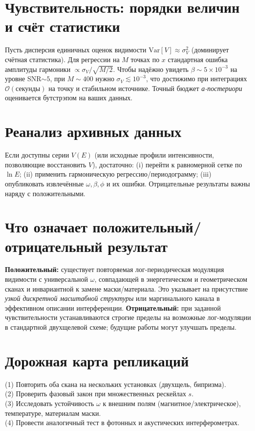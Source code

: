 \documentclass[a4paper,12pt]{article}
\begin{document}
\section{Чувствительность: порядки величин и счёт статистики}
Пусть дисперсия единичных оценок видимости $\mathrm{Var}[V]\approx\sigma_V^2$ (доминирует счётная статистика).
Для регрессии на $M$ точках по $x$ стандартная ошибка амплитуды гармоники $\propto\sigma_V/\sqrt{M/2}$.
Чтобы надёжно увидеть $\beta\sim5\times10^{-3}$ на уровне SNR$\sim5$, при $M\sim400$ нужно $\sigma_V\lesssim10^{-3}$,
что достижимо при интеграциях $\mathcal{O}(\text{секунды})$ на точку и стабильном источнике. Точный бюджет \emph{а-постериори}
оценивается бутстрэпом на ваших данных.

\section{Реанализ архивных данных}
Если доступны серии $V(E)$ (или исходные профили интенсивности, позволяющие восстановить $V$), достаточно:
(i) перейти к равномерной сетке по $\ln E$; (ii) применить гармоническую регрессию/периодограмму;
(iii) опубликовать извлечённые $\omega,\beta,\phi$ и их ошибки. Отрицательные результаты важны наряду с положительными.

\section{Что означает положительный/отрицательный результат}
\textbf{Положительный:} существует повторяемая лог-периодическая модуляция видимости с универсальной $\omega$,
совпадающей в энергетическом и геометрическом сканах и инвариантной к замене маски/материала. Это указывает
на присутствие \emph{узкой дискретной масштабной структуры} или маргинального канала в эффективном описании интерференции.
\textbf{Отрицательный:} при заданной чувствительности устанавливаются строгие пределы на возможные лог-модуляции
в стандартной двухщелевой схеме; будущие работы могут улучшать пределы.

\section{Дорожная карта репликаций}
(1) Повторить оба скана на нескольких установках (двухщель, бипризма). \\
(2) Проверить фазовый закон при множественных рескейлах $s$. \\
(3) Исследовать устойчивость $\omega$ к внешним полям (магнитное/электрическое), температуре, материалам маски. \\
(4) Провести аналогичный тест в фотонных и акустических интерферометрах.
\end{document}
